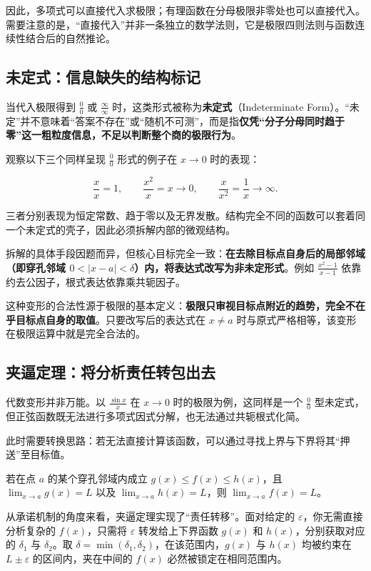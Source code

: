 因此，多项式可以直接代入求极限；有理函数在分母极限非零处也可以直接代入。需要注意的是，``直接代入''并非一条独立的数学法则，它是极限四则法则与函数连续性结合后的自然推论。

\subsection{未定式：信息缺失的结构标记}

当代入极限得到 \(\frac{0}{0}\) 或 \(\frac{\infty}{\infty}\) 时，这类形式被称为\textbf{未定式}（Indeterminate Form）。``未定''并不意味着``答案不存在''或``随机不可测''，而是指\textbf{仅凭``分子分母同时趋于零''这一粗粒度信息，不足以判断整个商的极限行为}。

观察以下三个同样呈现 \(\frac{0}{0}\) 形式的例子在 \(x\to0\) 时的表现：

\[
\frac{x}{x}=1,\qquad \frac{x^2}{x}=x\to0,\qquad \frac{x}{x^2}=\frac{1}{x}\to\infty.
\]

三者分别表现为恒定常数、趋于零以及无界发散。结构完全不同的函数可以套着同一个未定式的壳子，因此必须拆解内部的微观结构。

拆解的具体手段因题而异，但核心目标完全一致：\textbf{在去除目标点自身后的局部邻域（即穿孔邻域 \(0<\lvert x-a\rvert<\delta\)）内，将表达式改写为非未定形式}。例如 \(\frac{x^2-1}{x-1}\) 依靠约去公因子，根式表达依靠乘共轭因子。

这种变形的合法性源于极限的基本定义：\textbf{极限只审视目标点附近的趋势，完全不在乎目标点自身的取值}。只要改写后的表达式在 \(x\neq a\) 时与原式严格相等，该变形在极限运算中就是完全合法的。

\subsection{夹逼定理：将分析责任转包出去}

代数变形并非万能。以 \(\frac{\sin x}{x}\) 在 \(x\to0\) 时的极限为例，这同样是一个 \(\frac{0}{0}\) 型未定式，但正弦函数既无法进行多项式因式分解，也无法通过共轭根式化简。

此时需要转换思路：若无法直接计算该函数，可以通过寻找上界与下界将其``押送''至目标值。

\begin{theorem}
若在点 \(a\) 的某个穿孔邻域内成立 \(g(x)\le f(x)\le h(x)\)，且 \(\lim_{x\to a}g(x)=L\) 以及 \(\lim_{x\to a}h(x)=L\)，则 \(\lim_{x\to a}f(x)=L\)。
\end{theorem}

从承诺机制的角度来看，夹逼定理实现了``责任转移''。面对给定的 \(\varepsilon\)，你无需直接分析复杂的 \(f(x)\)，只需将 \(\varepsilon\) 转发给上下界函数 \(g(x)\) 和 \(h(x)\)，分别获取对应的 \(\delta_1\) 与 \(\delta_2\)。取 \(\delta=\min(\delta_1,\delta_2)\)，在该范围内，\(g(x)\) 与 \(h(x)\) 均被约束在 \(L\pm\varepsilon\) 的区间内，夹在中间的 \(f(x)\) 必然被锁定在相同范围内。


